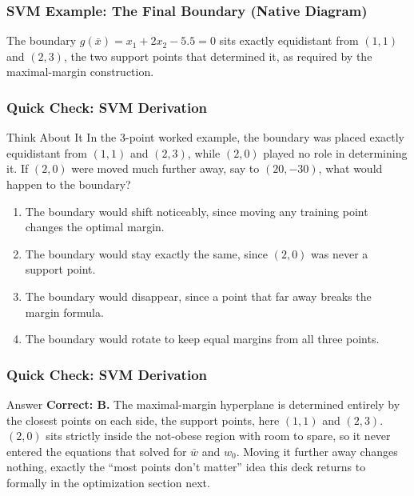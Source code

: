 \begin{frame}[fragile] \frametitle{SVM Example: The Final Boundary (Native Diagram)}
\begin{center}
\end{center}
\small{The boundary $g(\bar{x})=x_1+2x_2-5.5=0$ sits exactly equidistant from $(1,1)$ and
$(2,3)$, the two support points that determined it, as required by the maximal-margin
construction.}
\end{frame}

\begin{frame}[fragile]\frametitle{Quick Check: SVM Derivation}
\begin{block}{Think About It}
In the 3-point worked example, the boundary was placed exactly equidistant from $(1,1)$ and
$(2,3)$, while $(2,0)$ played no role in determining it. If $(2,0)$ were moved much further
away, say to $(20,-30)$, what would happen to the boundary?
\begin{enumerate}
\item[A.] The boundary would shift noticeably, since moving any training point changes the
optimal margin.
\item[B.] The boundary would stay exactly the same, since $(2,0)$ was never a support point.
\item[C.] The boundary would disappear, since a point that far away breaks the margin formula.
\item[D.] The boundary would rotate to keep equal margins from all three points.
\end{enumerate}
\end{block}
\end{frame}

\begin{frame}[fragile]\frametitle{Quick Check: SVM Derivation}
\begin{block}{Answer}
\textbf{Correct: B.} The maximal-margin hyperplane is determined entirely by the closest
points on each side, the support points, here $(1,1)$ and $(2,3)$. $(2,0)$ sits strictly
inside the not-obese region with room to spare, so it never entered the equations that solved
for $\bar{w}$ and $w_0$. Moving it further away changes nothing, exactly the ``most points
don't matter'' idea this deck returns to formally in the optimization section next.
\end{block}
\end{frame}

